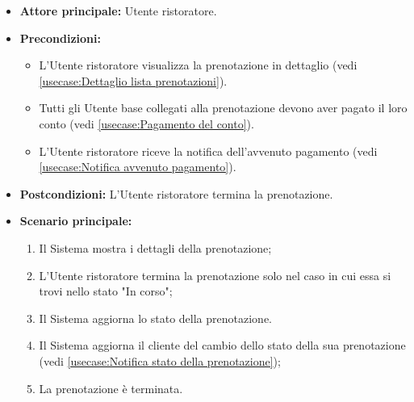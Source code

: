 \label{usecase:Termina prenotazione}
\begin{itemize}
	\item \textbf{Attore principale:} Utente ristoratore.

	\item \textbf{Precondizioni:} 
    \begin{itemize}
        \item L'Utente ristoratore visualizza la prenotazione in dettaglio (vedi \autoref{usecase:Dettaglio lista prenotazioni}).
        \item Tutti gli Utente base collegati alla prenotazione devono aver pagato il loro conto (vedi \autoref{usecase:Pagamento del conto}).
        \item L'Utente ristoratore riceve la notifica dell'avvenuto pagamento (vedi \autoref{usecase:Notifica avvenuto pagamento}).
    \end{itemize}

	\item \textbf{Postcondizioni:} L'Utente ristoratore termina la prenotazione.


	\item \textbf{Scenario principale:}
	      \begin{enumerate}
		      \item Il Sistema mostra i dettagli della prenotazione;
		      \item L'Utente ristoratore termina la prenotazione solo nel caso in cui essa si trovi nello stato "In corso";
		      \item Il Sistema aggiorna lo stato della prenotazione.
		      \item Il Sistema aggiorna il cliente del cambio dello stato della sua prenotazione (vedi \autoref{usecase:Notifica stato della prenotazione});
		      \item La prenotazione è terminata.

	      \end{enumerate}
\end{itemize}
